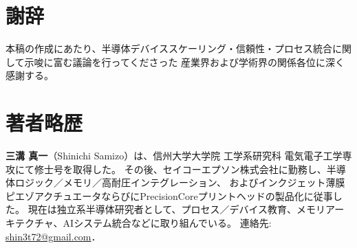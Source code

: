 \documentclass[conference]{IEEEtran}
\begin{document}
\section*{謝辞}
本稿の作成にあたり、半導体デバイススケーリング・信頼性・プロセス統合に関して示唆に富む議論を行ってくださった
産業界および学術界の関係各位に深く感謝する。

\nocite{*}



\section*{著者略歴}
\textbf{三溝 真一}（Shinichi Samizo）は、信州大学大学院 工学系研究科 電気電子工学専攻にて修士号を取得した。  
その後、セイコーエプソン株式会社に勤務し、半導体ロジック／メモリ／高耐圧インテグレーション、  
およびインクジェット薄膜ピエゾアクチュエータならびにPrecisionCoreプリントヘッドの製品化に従事した。  
現在は独立系半導体研究者として、プロセス／デバイス教育、メモリアーキテクチャ、AIシステム統合などに取り組んでいる。  
連絡先: \href{mailto:shin3t72@gmail.com}{shin3t72@gmail.com}．
\end{document}
